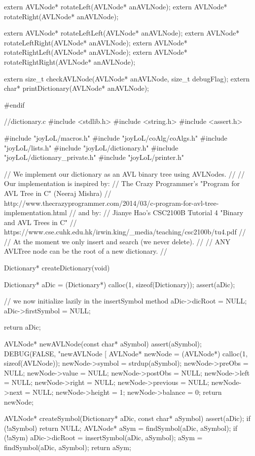 extern AVLNode* rotateLeft(AVLNode* anAVLNode);
extern AVLNode* rotateRight(AVLNode* anAVLNode);

extern AVLNode* rotateLeftLeft(AVLNode* anAVLNode);
extern AVLNode* rotateLeftRight(AVLNode* anAVLNode);
extern AVLNode* rotateRightLeft(AVLNode* anAVLNode);
extern AVLNode* rotateRightRight(AVLNode* anAVLNode);

extern size_t checkAVLNode(AVLNode* anAVLNode, size_t debugFlag);
extern char* printDictionary(AVLNode* anAVLNode);

#endif
\stoptyping

\starttyping
//dictionary.c
#include <stdlib.h>
#include <string.h>
#include <assert.h>

#include "joyLoL/macros.h"
#include "joyLoL/coAlg/coAlgs.h"
#include "joyLoL/lists.h"
#include "joyLoL/dictionary.h"
#include "joyLoL/dictionary_private.h"
#include "joyLoL/printer.h"

// We implement our dictionary as an AVL binary tree using AVLNodes.
//
// Our implementation is inspired by:
// The Crazy Programmer's "Program for AVL Tree in C" (Neeraj Mishra)
// http://www.thecrazyprogrammer.com/2014/03/c-program-for-avl-tree-implementation.html
// and by:
// Jianye Hao's CSC2100B Tutorial 4 "Binary and AVL Trees in C"
// https://www.cse.cuhk.edu.hk/irwin.king/_media/teaching/csc2100b/tu4.pdf
//
// At the moment we only insert and search (we never delete).
//
// ANY AVLTree node can be the root of a new dictionary.
//

Dictionary* createDictionary(void) {
  Dictionary* aDic = (Dictionary*) calloc(1, sizeof(Dictionary));
  assert(aDic);

  // we now initialize lazily in the insertSymbol method
  aDic->dicRoot     = NULL;
  aDic->firstSymbol = NULL;

  return aDic;
}

AVLNode* newAVLNode(const char* aSymbol) {
  assert(aSymbol);
  DEBUG(FALSE, "newAVLNode [%
  AVLNode* newNode  = (AVLNode*) calloc(1, sizeof(AVLNode));
  newNode->symbol   = strdup(aSymbol);
  newNode->preObs   = NULL;
  newNode->value    = NULL;
  newNode->postObs  = NULL;
  newNode->left     = NULL;
  newNode->right    = NULL;
  newNode->previous = NULL;
  newNode->next     = NULL;
  newNode->height   = 1;
  newNode->balance  = 0;
  return newNode;
}

AVLNode* createSymbol(Dictionary* aDic, const char* aSymbol) {
  assert(aDic);
  if (!aSymbol) return NULL;
  AVLNode* aSym = findSymbol(aDic, aSymbol);
  if (!aSym) {
    aDic->dicRoot = insertSymbol(aDic, aSymbol);
    aSym = findSymbol(aDic, aSymbol);
  }
  return aSym;
}

